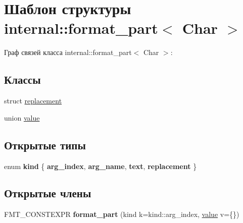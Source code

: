 \hypertarget{structinternal_1_1format__part}{}\section{Шаблон структуры internal\+:\+:format\+\_\+part$<$ Char $>$}
\label{structinternal_1_1format__part}


Граф связей класса internal\+:\+:format\+\_\+part$<$ Char $>$\+:
\subsection*{Классы}
\begin{DoxyCompactItemize}
\item 
struct \hyperlink{structinternal_1_1format__part_1_1replacement}{replacement}
\item 
union \hyperlink{unioninternal_1_1format__part_1_1value}{value}
\end{DoxyCompactItemize}
\subsection*{Открытые типы}
\begin{DoxyCompactItemize}
\item 
\mbox{\label{structinternal_1_1format__part_ae4953e23759e3e629891dfcee8c74082}} 
enum {\bfseries kind} \{ {\bfseries arg\+\_\+index}, 
{\bfseries arg\+\_\+name}, 
{\bfseries text}, 
{\bfseries replacement}
 \}
\end{DoxyCompactItemize}
\subsection*{Открытые члены}
\begin{DoxyCompactItemize}
\item 
\mbox{\label{structinternal_1_1format__part_ac13bbba23e626bbf397137d8f0f08a6a}} 
F\+M\+T\+\_\+\+C\+O\+N\+S\+T\+E\+X\+PR {\bfseries format\+\_\+part} (kind k=kind\+::arg\+\_\+index, \hyperlink{unioninternal_1_1format__part_1_1value}{value} v=\{\})
\end{DoxyCompactItemize}
